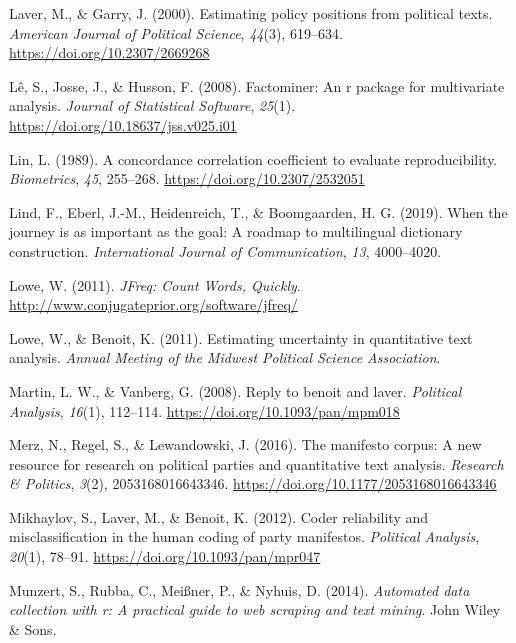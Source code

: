\documentclass[
]{book}
\newlength{\cslhangindent}
\newenvironment{CSLReferences}[2] %
 {\begin{list}{}{%
  \setlength{\itemindent}{0pt}
  \setlength{\leftmargin}{0pt}
  \setlength{\parsep}{0pt}
  \ifodd #1
   \setlength{\leftmargin}{\cslhangindent}
   \setlength{\itemindent}{-1\cslhangindent}
  \fi
  \setlength{\itemsep}{#2\baselineskip}}}
 {\end{list}}
\begin{document}
\begin{CSLReferences}{1}{2}
Laver, M., \& Garry, J. (2000). Estimating policy positions from political texts. \emph{American Journal of Political Science}, \emph{44}(3), 619--634. \url{https://doi.org/10.2307/2669268}

Lê, S., Josse, J., \& Husson, F. (2008). Factominer: An r package for multivariate analysis. \emph{Journal of Statistical Software}, \emph{25}(1). \url{https://doi.org/10.18637/jss.v025.i01}

Lin, L. (1989). A concordance correlation coefficient to evaluate reproducibility. \emph{Biometrics}, \emph{45}, 255--268. \url{https://doi.org/10.2307/2532051}

Lind, F., Eberl, J.-M., Heidenreich, T., \& Boomgaarden, H. G. (2019). When the journey is as important as the goal: A roadmap to multilingual dictionary construction. \emph{International Journal of Communication}, \emph{13}, 4000--4020.

Lowe, W. (2011). \emph{{JFreq: Count Words, Quickly}}. \url{http://www.conjugateprior.org/software/jfreq/}

Lowe, W., \& Benoit, K. (2011). Estimating uncertainty in quantitative text analysis. \emph{Annual Meeting of the Midwest Political Science Association}.

Martin, L. W., \& Vanberg, G. (2008). Reply to benoit and laver. \emph{Political Analysis}, \emph{16}(1), 112--114. \url{https://doi.org/10.1093/pan/mpm018}

Merz, N., Regel, S., \& Lewandowski, J. (2016). The manifesto corpus: A new resource for research on political parties and quantitative text analysis. \emph{Research \& Politics}, \emph{3}(2), 2053168016643346. \url{https://doi.org/10.1177/2053168016643346}

Mikhaylov, S., Laver, M., \& Benoit, K. (2012). Coder reliability and misclassification in the human coding of party manifestos. \emph{Political Analysis}, \emph{20}(1), 78--91. \url{https://doi.org/10.1093/pan/mpr047}

Munzert, S., Rubba, C., Meißner, P., \& Nyhuis, D. (2014). \emph{Automated data collection with r: A practical guide to web scraping and text mining}. John Wiley \& Sons.


\end{CSLReferences}
\end{document}
